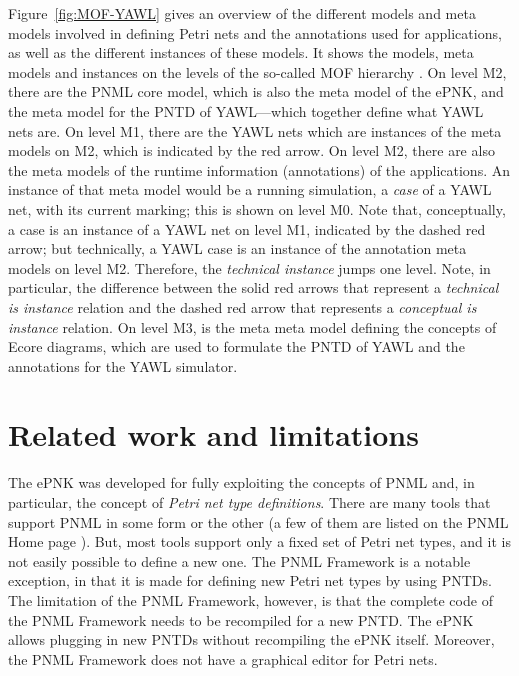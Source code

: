 \documentclass[a4paper]{llncs}
\begin{document}
Figure~\ref{fig:MOF-YAWL} gives an overview of the different models and
meta models involved in defining Petri nets and the annotations used for 
applications, as well
as the different instances of these models. It shows the models, meta models and
instances on the levels of the so-called MOF hierarchy \cite{MOF05}. On level M2,
there are the PNML core model, which is also the meta model of the ePNK, and
the meta model for the PNTD of YAWL---which together define what YAWL nets
are. On level M1, there are the
YAWL nets which are instances of the meta models on M2, which is indicated
by the red arrow. On level M2, there are also the meta models of the runtime
information (annotations) of the applications. An instance of that meta model would
be a running simulation, a \emph{case} of a YAWL net, with its current marking;
this is shown on level M0.
Note that, conceptually, a case is an instance of a YAWL net on level M1,
indicated by the dashed red arrow; but technically, a YAWL case is an instance
of the annotation meta models on level M2. Therefore, the \emph{technical instance}
jumps one level. Note, in particular, the difference between the solid red arrows that
represent a \emph{technical is instance} relation and the dashed red arrow that
represents a \emph{conceptual is instance} relation.
On level M3, is the meta meta model defining the concepts of Ecore diagrams,
which are used to formulate the PNTD of YAWL and the annotations for the
YAWL simulator.

\section{Related work and limitations}
\label{sec:related-work}

The ePNK was developed for fully exploiting the concepts of PNML \cite{HKea09} and,
in particular, the concept of \emph{Petri net type definitions}. There are many
tools that support PNML in some form or the other (a few of them are listed on the
PNML Home page \cite{PNMLURL09}). But, most tools support only a fixed set of Petri
net types, and it is not easily possible to define a new one. The PNML Framework
\cite{DBLP:conf/apn/HillahKPT10} is a notable exception, in that it is made for defining
new Petri net types by using PNTDs. The limitation of the PNML Framework, however, is
that the complete code of the PNML Framework needs to be recompiled for
a new PNTD. The ePNK allows plugging in new PNTDs without recompiling the
ePNK itself. Moreover, the PNML Framework does not have a graphical editor for Petri
nets.
\end{document}
